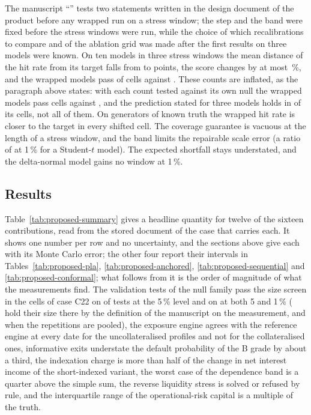 The manuscript ``\pxPaperTitleSixteen{}'' tests two statements written in the design document of the product before any wrapped run on a stress window; the step and the band were fixed before the stress
windows were run, while the choice of which recalibrations to compare and of the ablation grid was made after the first results on three models were known. On ten models in three stress windows the mean distance of
the hit rate from its target falls from \pxPpSixteenDevUnw{} to \pxPpSixteenDevAci{} points, the score changes by at most \pxPpSixteenWorstFz{}\,\%, and the wrapped models pass \pxPpSixteenPassAci{} of
\pxPpSixteenRuns{} cells against \pxPpSixteenPassUnw{}. These counts are inflated, as the paragraph above states: with each count tested against its own null the wrapped models pass \pxPpSixteenWrapCal{} cells
against \pxPpSixteenUnwExact{}, and the prediction stated for three models holds in \pxPpSixteenHoneGain{} of its \pxPpSixteenCells{} cells, not all of them. On generators of known truth the wrapped hit rate is closer
to the target in every shifted cell. The coverage guarantee is vacuous at the length of a stress window, and the band limits the repairable scale error (a ratio of \pxPpSixteenScaleRatio{} at 1\,\% for a
Student-$t$ model). The expected shortfall stays understated, and the delta-normal model gains no window at 1\,\%.

\subsection{Results}
\label{sec:results-proposed}

Table~\ref{tab:proposed-summary} gives a headline quantity for twelve of the sixteen contributions, read from the stored document of the case that carries each. It shows one number per row and no uncertainty, and the sections above give each with its Monte Carlo error; the other four report their intervals in Tables~\ref{tab:proposed-pla}, \ref{tab:proposed-anchored}, \ref{tab:proposed-sequential} and \ref{tab:proposed-conformal}; what follows from it is the order of magnitude of what the measurements find. The validation tests of the null family pass the size screen in the cells of case C22
on \rsCTwentyTwoWithinFive{} of \pxOneTests{} tests at the 5\,\% level and on \pxOneWithinBoth{} at both 5 and 1\,\% (\pxPpOneHoldCell{} hold their size there by the definition of the manuscript on the measurement, and \pxPpOneHold{} when the repetitions are pooled), the exposure engine agrees with the reference engine at every date for the uncollateralised profiles and not for the collateralised ones, informative exits understate the default probability of the B grade by about a third, the
indexation charge is more than half of the change in net interest income of the short-indexed variant, the worst case of the dependence band is a quarter above the simple sum, the reverse liquidity stress is solved or refused by rule, and the
interquartile range of the operational-risk capital is a multiple of the truth.

